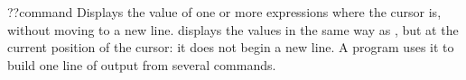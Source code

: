 \begin{XbaseEntry}{??}{command}
Displays the value of one or more expressions where the cursor is, without
moving to a new line.
\Syntax
{}
\Usage
{} displays the values in the same way as , but at the current
position of the cursor: it does not begin a new line.  A program uses it to
build one line of output from several commands.
\Examples
{}
\end{XbaseEntry}


